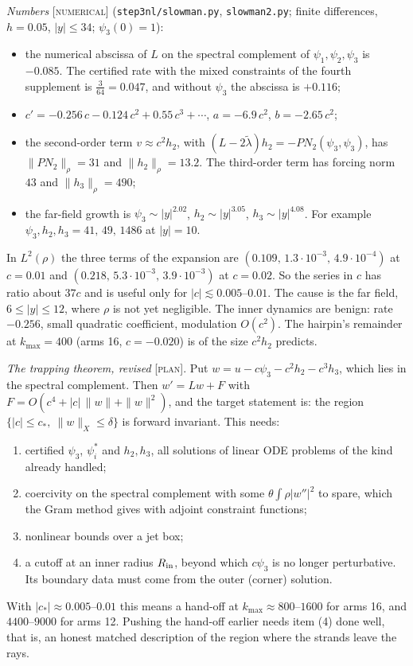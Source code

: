 \documentclass[11pt]{amsart}
\theoremstyle{remark}
\newcommand{\lab}[1]{\textup{\textsc{[#1]}}}
\begin{document}
\emph{Numbers} \lab{numerical} (\texttt{step3nl/slowman.py}, \texttt{slowman2.py}; finite differences, $h=0.05$, $|y|\le34$; $\psi_3(0)=1$):
\begin{itemize}
\item the numerical abscissa of $L$ on the spectral complement of $\psi_1,\psi_2,\psi_3$ is $-0.085$. The certified rate with the mixed constraints of the fourth supplement is $\frac3{64}=0.047$, and without $\psi_3$ the abscissa is $+0.116$;
\item $c'=-0.256\,c-0.124\,c^2+0.55\,c^3+\cdots$, $a=-6.9\,c^2$, $b=-2.65\,c^2$;
\item the second-order term $v\approx c^2h_2$, with $(L-2\tilde\lambda)h_2=-PN_2(\psi_3,\psi_3)$, has $\|PN_2\|_\rho=31$ and $\|h_2\|_\rho=13.2$. The third-order term has forcing norm $43$ and $\|h_3\|_\rho=490$;
\item the far-field growth is $\psi_3\sim|y|^{2.02}$, $h_2\sim|y|^{3.05}$, $h_3\sim|y|^{4.08}$. For example $\psi_3,h_2,h_3=41,\,49,\,1486$ at $|y|=10$.
\end{itemize}
In $L^2(\rho)$ the three terms of the expansion are $(0.109,\,1.3\cdot10^{-3},\,4.9\cdot10^{-4})$ at $c=0.01$ and $(0.218,\,5.3\cdot10^{-3},\,3.9\cdot10^{-3})$ at $c=0.02$. So the series in $c$ has ratio about $37c$ and is useful only for $|c|\lesssim0.005$--$0.01$. The cause is the far field, $6\le|y|\le12$, where $\rho$ is not yet negligible. The inner dynamics are benign: rate $-0.256$, small quadratic coefficient, modulation $O(c^2)$. The hairpin's remainder at $k_{\max}=400$ (arms 16, $c=-0.020$) is of the size $c^2h_2$ predicts.

\emph{The trapping theorem, revised} \lab{plan}. Put $w=u-c\psi_3-c^2h_2-c^3h_3$, which lies in the spectral complement. Then $w'=Lw+F$ with $F=O(c^4+|c|\,\|w\|+\|w\|^2)$, and the target statement is: the region $\{|c|\le c_*,\ \|w\|_X\le\delta\}$ is forward invariant. This needs:
\begin{enumerate}
\item certified $\psi_3$, $\psi_i^*$ and $h_2,h_3$, all solutions of linear ODE problems of the kind already handled;
\item coercivity on the spectral complement with some $\theta\int\rho|w''|^2$ to spare, which the Gram method gives with adjoint constraint functions;
\item nonlinear bounds over a jet box;
\item a cutoff at an inner radius $R_{\rm in}$, beyond which $c\psi_3$ is no longer perturbative. Its boundary data must come from the outer (corner) solution.
\end{enumerate}
With $|c_*|\approx0.005$--$0.01$ this means a hand-off at $k_{\max}\approx800$--$1600$ for arms 16, and $4400$--$9000$ for arms 12. Pushing the hand-off earlier needs item (4) done well, that is, an honest matched description of the region where the strands leave the rays.
\end{document}
